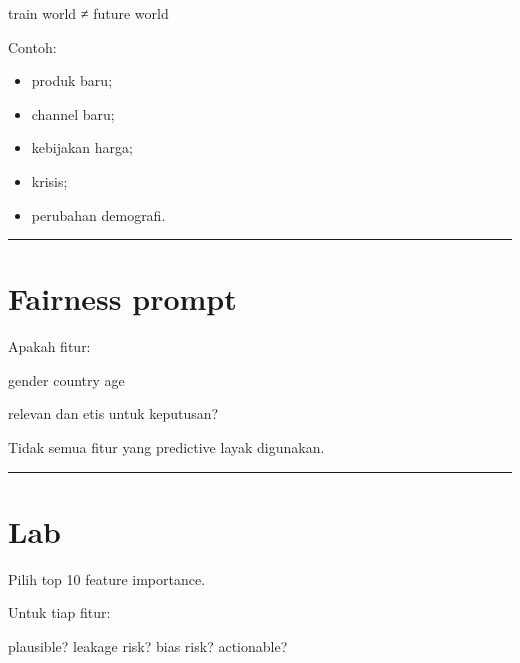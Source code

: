 \documentclass[
  indonesian,
  letterpaper,
  DIV=11,
  numbers=noendperiod]{scrreprt}
\newenvironment{Shaded}{\begin{snugshade}}{\end{snugshade}}
\newcommand{\NormalTok}[1]{\textcolor[rgb]{0.00,0.23,0.31}{#1}}
\providecommand{\tightlist}{%
  \setlength{\itemsep}{0pt}\setlength{\parskip}{0pt}}
\begin{document}
\begin{Shaded}
\begin{Highlighting}[]
\NormalTok{train world ≠ future world}
\end{Highlighting}
\end{Shaded}

Contoh:

\begin{itemize}
\tightlist
\item
  produk baru;
\item
  channel baru;
\item
  kebijakan harga;
\item
  krisis;
\item
  perubahan demografi.
\end{itemize}

\begin{center}\rule{0.5\linewidth}{0.5pt}\end{center}

\section{Fairness prompt}\label{fairness-prompt}

Apakah fitur:

\begin{Shaded}
\begin{Highlighting}[]
\NormalTok{gender}
\NormalTok{country}
\NormalTok{age}
\end{Highlighting}
\end{Shaded}

relevan dan etis untuk keputusan?

Tidak semua fitur yang predictive layak digunakan.

\begin{center}\rule{0.5\linewidth}{0.5pt}\end{center}

\section{Lab}\label{lab-6}

Pilih top 10 feature importance.

Untuk tiap fitur:

\begin{Shaded}
\begin{Highlighting}[]
\NormalTok{plausible?}
\NormalTok{leakage risk?}
\NormalTok{bias risk?}
\NormalTok{actionable?}
\end{Highlighting}
\end{Shaded}
\end{document}
